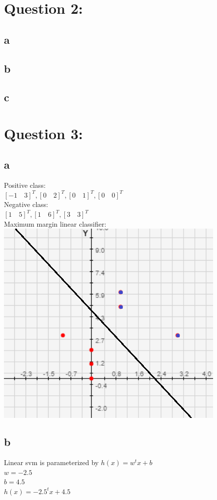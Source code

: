 \documentclass[11pt, oneside]{article}   	%
\begin{document}
\begin{flushleft}
\section*{Question 2:}
\subsection*{a}

\subsection*{b}

\subsection*{c}

\section*{Question 3:}
\subsection*{a}
Positive class: \\
$[-1\quad3]^T ,[0\quad2]^T ,[0\quad1]^T ,[0\quad0]^T $\\
Negative class: \\
$[1\quad5]^T ,[1\quad6]^T ,[3\quad3]^T $\\
Maximum margin linear classifier:\\
\includegraphics[]{q3_1.png}
\subsection*{b}
Linear svm is parameterized by $h(x)=w^t x+b$\\
$w=-2.5$\\
$b=4.5$\\
 $h(x)=-2.5^t x+4.5$\\

\end{flushleft}
\end{document}
